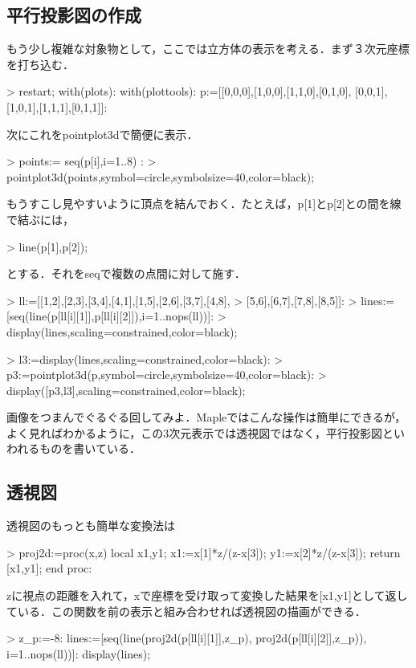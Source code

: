 \subsection{平行投影図の作成}
もう少し複雑な対象物として，ここでは立方体の表示を考える．まず３次元座標を打ち込む．
\begin{MapleInput}
> restart; with(plots): with(plottools): 
  p:=[[0,0,0],[1,0,0],[1,1,0],[0,1,0],
  [0,0,1],[1,0,1],[1,1,1],[0,1,1]]:
\end{MapleInput}
\begin{MapleOutput}
\end{MapleOutput}
次にこれをpointplot3dで簡便に表示．
\begin{MapleInput}
> points:= { seq(p[i],i=1..8) }:
> pointplot3d(points,symbol=circle,symbolsize=40,color=black);
\end{MapleInput}
もうすこし見やすいように頂点を結んでおく．たとえば，p[1]とp[2]との間を線で結ぶには，

\begin{MapleInput}
> line(p[1],p[2]);
\end{MapleInput}
とする．それをseqで複数の点間に対して施す．

\begin{MapleInput}
> ll:=[[1,2],[2,3],[3,4],[4,1],[1,5],[2,6],[3,7],[4,8],
> [5,6],[6,7],[7,8],[8,5]]:
> lines:=[seq(line(p[ll[i][1]],p[ll[i][2]]),i=1..nops(ll))]:
> display(lines,scaling=constrained,color=black);
\end{MapleInput}

\begin{MapleInput}
> l3:=display(lines,scaling=constrained,color=black):
> p3:=pointplot3d(p,symbol=circle,symbolsize=40,color=black):
> display([p3,l3],scaling=constrained,color=black);
\end{MapleInput}


画像をつまんでぐるぐる回してみよ．Mapleではこんな操作は簡単にできるが，よく見ればわかるように，この3次元表示では透視図ではなく，平行投影図といわれるものを書いている．

\subsection{透視図}
透視図のもっとも簡単な変換法は
\begin{MapleInput}
> proj2d:=proc(x,z) 
    local x1,y1; 
    x1:=x[1]*z/(z-x[3]); 
    y1:=x[2]*z/(z-x[3]);
    return [x1,y1]; 
  end proc:
\end{MapleInput}
\begin{MapleOutput}
\end{MapleOutput}
zに視点の距離を入れて，xで座標を受け取って変換した結果を[x1,y1]として返している．この関数を前の表示と組み合わせれば透視図の描画ができる．
\begin{MapleInput}
> z_p:=-8:
  lines:=[seq(line(proj2d(p[ll[i][1]],z_p), proj2d(p[ll[i][2]],z_p)), i=1..nops(ll))]:
  display(lines);
\end{MapleInput}

